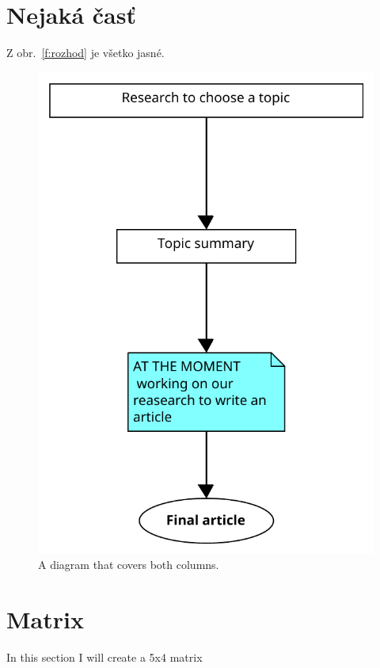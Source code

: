 \documentclass[10pt,twocolumn,twoside,slovak,a4paper]{article}
\begin{document}
\section{Nejaká časť} \label{nejaka}

Z obr.~\ref{f:rozhod} je všetko jasné. 

\begin{figure}
\centering
\includegraphics[scale=0.5]{diagram1.pdf}
\caption{A diagram that covers both columns.}
 \label{fig:wide_diagram1}
\end{figure}

\section{Matrix} \label{matrix}

In this section I will create a 5x4 matrix
\end{document}
